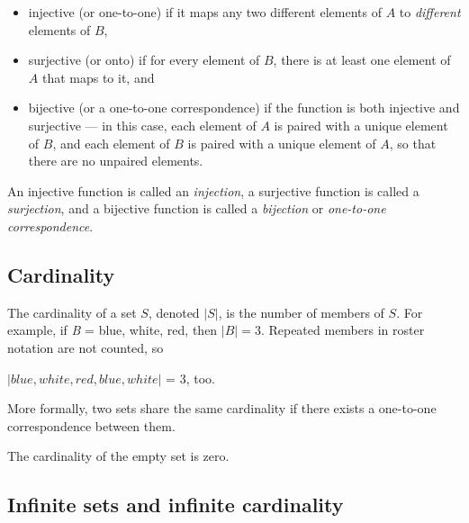 \begin{itemize}
    \item injective (or one-to-one) if it maps any two different elements of $A$ to \textit{different} elements of $B$,
    \item surjective (or onto) if for every element of $B$, there is at least one element of $A$ that maps to it, and
    \item bijective (or a one-to-one correspondence) if the function is both injective and surjective — in this case, each element of $A$ is paired with a unique element of $B$, and each element of $B$ is paired with a unique element of $A$, so that there are no unpaired elements.
\end{itemize}

An injective function is called an \textit{injection}, a surjective function is called a
\textit{surjection}, and a bijective function is called a \textit{bijection} or
\textit{one-to-one correspondence}.




\subsection{Cardinality}
\label{sss:card-e104}




The cardinality of a set $S$, denoted $|S|$, is the number of members of $S$. For
example, if \textit{B} = {blue, white, red}, then $|B| = 3$. Repeated members in roster
notation are not counted, so



$|{blue, white, red, blue, white}|$ = 3, too.



More formally, two sets share the same cardinality if there exists a one-to-one
correspondence between them.



The cardinality of the empty set is zero.




\subsection{Infinite sets and infinite cardinality}
\label{sss:infi-c2f8}





